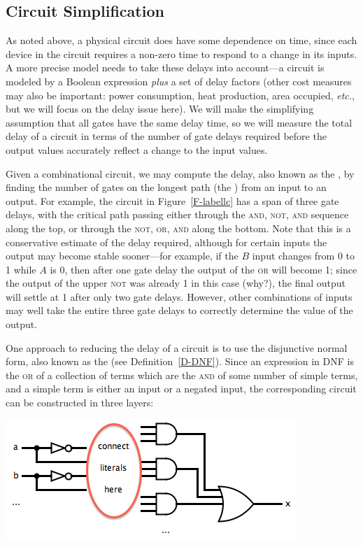 \subsection{Circuit Simplification}\label{sec:circsimp}
As noted above, a physical circuit does have some dependence on time, since each device in the circuit requires a non-zero time to respond to a change in its inputs. A more precise model needs to take these delays into account---a circuit is modeled by a Boolean expression \emph{plus} a set of delay factors (other cost measures may also be important: power consumption, heat production, area occupied, \textit{etc.}, but we will focus on the delay issue here). We will make the simplifying assumption that all gates have the same delay time, so we will measure the total delay of a circuit in terms of the number of gate delays required before the output values accurately reflect a change to the input values.

Given a combinational circuit, we may compute the delay, also known as the , by finding the number of gates on the longest path (the ) from an input to an output. For example, the circuit in Figure~\ref{F-labellc} has a span of three gate delays, with the critical path passing either through the \textsc{and}, \textsc{not}, \textsc{and} sequence along the top, or through the \textsc{not}, \textsc{or}, \textsc{and} along the bottom. Note that this is a conservative estimate of the delay required, although for certain inputs the output may become stable sooner---for example, if the $B$ input changes from 0 to 1
while $A$ is 0, then after one gate delay the output of the \textsc{or} will become 1; since the output of the upper \textsc{not} was already 1 in this case (why?), the final output will settle at 1 after only two gate delays. However, other combinations of inputs may well take the entire three gate delays to correctly determine the value of the output.

One approach to reducing the delay of a circuit is to use the disjunctive normal form, also known as the  (see Definition~\ref{D-DNF}). Since an expression in DNF is the \textsc{or} of a collection of terms which are the \textsc{and} of some number of simple terms, and a simple term is either an input or a negated input, the corresponding circuit can be constructed in three layers:
\begin{center}
\includegraphics[width=!,height=!,scale=0.75]{graphics/DNFlayers.png}
\end{center}

